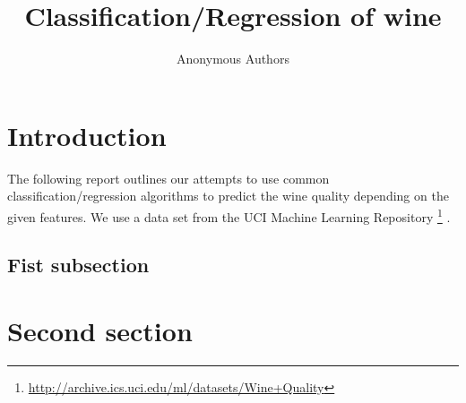 \documentclass[twocolumn]{scrartcl}
\title{Classification/Regression of wine}
\author{Anonymous Authors}
\begin{document}
\maketitle

\section{Introduction}

The following report outlines our attempts to use common classification/regression
algorithms to predict the wine quality depending on the given features.
We use a data set from the UCI Machine Learning Repository
\footnote{\url{http://archive.ics.uci.edu/ml/datasets/Wine+Quality}} \parencite{data}.

\subsection{Fist subsection}

\section{Second section}

\printbibliography
\end{document}
